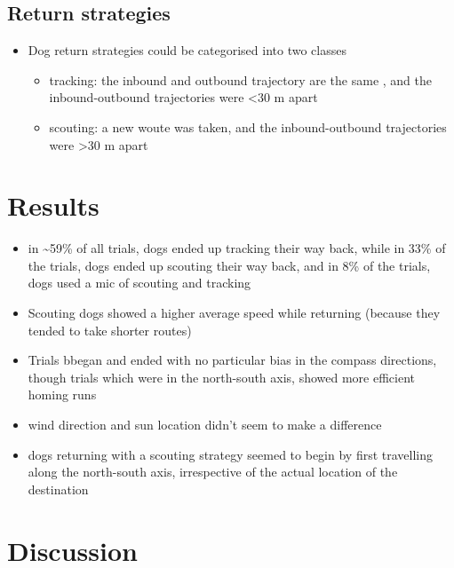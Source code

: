 \documentclass[
]{book}
\providecommand{\tightlist}{%
  \setlength{\itemsep}{0pt}\setlength{\parskip}{0pt}}
\begin{document}
\hypertarget{return-strategies}{%
\subsection{Return strategies}\label{return-strategies}}

\begin{itemize}
\tightlist
\item
  Dog return strategies could be categorised into two classes

  \begin{itemize}
  \tightlist
  \item
    tracking: the inbound and outbound trajectory are the same , and the inbound-outbound trajectories were \textless30 m apart
  \item
    scouting: a new woute was taken, and the inbound-outbound trajectories were \textgreater30 m apart
  \end{itemize}
\end{itemize}

\hypertarget{results}{%
\section{Results}\label{results}}

\begin{itemize}
\tightlist
\item
  in \textasciitilde59\% of all trials, dogs ended up tracking their way back, while in 33\% of the trials, dogs ended up scouting their way back, and in 8\% of the trials, dogs used a mic of scouting and tracking
\item
  Scouting dogs showed a higher average speed while returning (because they tended to take shorter routes)
\item
  Trials bbegan and ended with no particular bias in the compass directions, though trials which were in the north-south axis, showed more efficient homing runs
\item
  wind direction and sun location didn't seem to make a difference
\item
  dogs returning with a scouting strategy seemed to begin by first travelling along the north-south axis, irrespective of the actual location of the destination
\end{itemize}

\hypertarget{discussion}{%
\section{Discussion}\label{discussion}}
\end{document}
